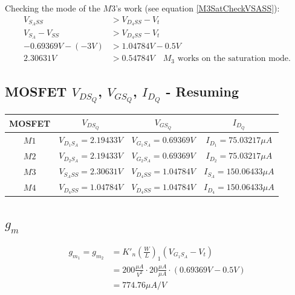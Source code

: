 \documentclass[10pt,a4paper]{book}
\begin{document}
Checking the mode of the $M3$'s work (see equation \ref{M3SatCheckVSASS}):
\begin{align}
V_{{S_A}SS} &> V_{{D_4}SS} - V_t\\
V_{S_A} - V_{SS} &> V_{{D_4}SS} - V_t\\
-0.69369V - (-3V) &> 1.04784V - 0.5V\\
2.30631V &> 0.54784V \quad M_3\text{ works on the saturation mode.}
\end{align}

\subsection{MOSFET $V_{DS_Q}$, $V_{GS_Q}$, $I_{D_Q}$ - Resuming}
\begin{center}
\begin{tabular}{|c|c|c|c|}
\hline
MOSFET & $V_{DS_Q}$ & $V_{GS_Q}$ & $I_{D_Q}$ \\
\hline
$M1$ & $V_{D_1S_A} = 2.19433V$ & $V_{G_1S_A} = 0.69369V$ & $I_{D_1} = 75.03217\mu A$ \\
\hline
$M2$ & $V_{D_2S_A} = 2.19433V$ & $V_{G_2S_A} = 0.69369V$ & $I_{D_2} = 75.03217\mu A$ \\
\hline
$M3$ & $V_{S_ASS} = 2.30631V$ & $V_{D_4SS} = 1.04784V$ & $I_{S_A} = 150.06433 \mu A$ \\
\hline
$M4$ & $V_{D_4SS} = 1.04784V$ & $V_{D_4SS} = 1.04784V$ & $I_{D_4} = 150.06433 \mu A$ \\
\hline
\end{tabular}
\end{center}

\subsection{$g_m$}
\begin{align}
g_{m_1} = g_{m_2} &= K'_n \left(\frac{W}{L}\right)_1 (V_{G_1S_A} - V_t)\\
&= 200 \frac{\mu A}{V^2} \cdot 20 \frac{\mu A}{\mu A} \cdot (0.69369V-0.5V)\\
&= 774.76 \mu A/V
\end{align}
\end{document}
